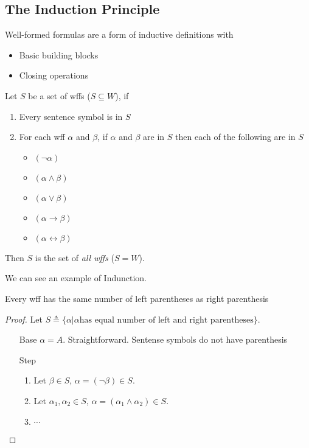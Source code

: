 \subsection{The Induction Principle}
\label{sub:Induction}

Well-formed formulas are a form of inductive definitions with
\begin{itemize}
    \item Basic building blocks
    \item Closing operations
\end{itemize}

\begin{theorem}
    \label{thm:InductionPrinciple}
    Let $S$ be a set of wffs ($S \subseteq W$), if
    \begin{enumerate}
        \item Every sentence symbol is in $S$
        \item For each wff $\alpha$ and $\beta$, if $\alpha$ and $\beta$ are in $S$ then each of the following are in $S$
        \begin{itemize}
            \item $(\neg \alpha)$
            \item $(\alpha \wedge \beta)$
            \item $(\alpha \vee \beta)$
            \item $(\alpha \rightarrow \beta)$
            \item $(\alpha \leftrightarrow \beta)$
        \end{itemize}
    \end{enumerate}
    Then $S$ is the set of \emph{all wffs} ($S = W$).
\end{theorem}

We can see an example of Indunction.

\begin{proposition}
    Every wff has the same number of left parentheses as right parenthesis
\end{proposition}
\begin{proof}
    Let $S\triangleq \{\alpha|\alpha\text{has equal number of left and right parentheses}\}$.
    \begin{itemize}
        \item[Base] $\alpha = A$. Straightforward. Sentense symbols do not have parenthesis
        \item[Step]
        \begin{enumerate}
            \item Let $\beta \in S$, $\alpha = (\neg \beta) \in S$.
            \item Let $\alpha_1, \alpha_2 \in S$, $\alpha = (\alpha_1 \wedge \alpha_2) \in S$.
            \item $\cdots$
        \end{enumerate} 
    \end{itemize}
\end{proof}

